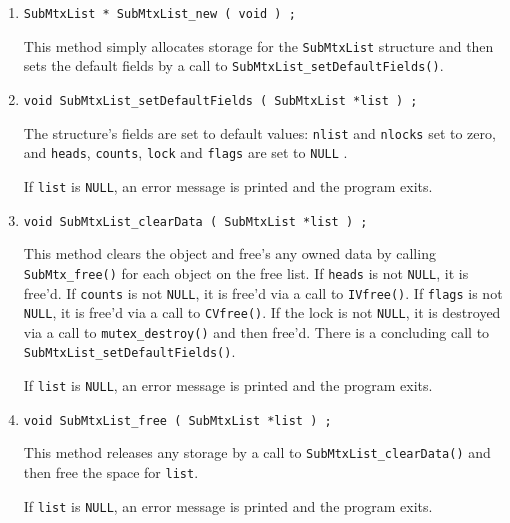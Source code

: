 \begin{enumerate}
\item
\begin{verbatim}
SubMtxList * SubMtxList_new ( void ) ;
\end{verbatim}
This method simply allocates storage 
for the {\tt SubMtxList} structure 
and then sets the default fields by a call to 
{\tt SubMtxList\_setDefaultFields()}.
\item
\begin{verbatim}
void SubMtxList_setDefaultFields ( SubMtxList *list ) ;
\end{verbatim}
The structure's fields are set to default values:
{\tt nlist} and {\tt nlocks} set to zero,
and {\tt heads}, {\tt counts}, {\tt lock} and {\tt flags} 
are set to {\tt NULL} .
\par {}
If {\tt list} is {\tt NULL},
an error message is printed and the program exits.
\item
\begin{verbatim}
void SubMtxList_clearData ( SubMtxList *list ) ;
\end{verbatim}
This method clears the object and free's any owned data
by calling {\tt SubMtx\_free()} for each object on the free
list.
If {\tt heads} is not {\tt NULL}, it is free'd.
If {\tt counts} is not {\tt NULL}, 
it is free'd via a call to {\tt IVfree()}.
If {\tt flags} is not {\tt NULL}, 
it is free'd via a call to {\tt CVfree()}.
If the lock is not {\tt NULL}, it is destroyed via a call to
{\tt mutex\_destroy()} and then free'd.
There is a concluding call to 
{\tt SubMtxList\_setDefaultFields()}.
\par {}
If {\tt list} is {\tt NULL},
an error message is printed and the program exits.
\item
\begin{verbatim}
void SubMtxList_free ( SubMtxList *list ) ;
\end{verbatim}
This method releases any storage by a call to 
{\tt SubMtxList\_clearData()} 
and then free the space for {\tt list}.
\par {}
If {\tt list} is {\tt NULL},
an error message is printed and the program exits.
\end{enumerate}
\par
